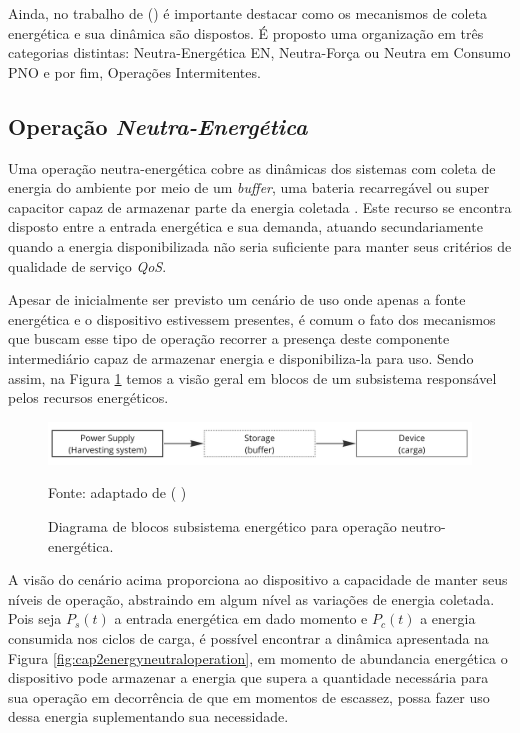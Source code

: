 Ainda, no trabalho de \citeauthor{sliper_energy-driven_2020} (\citeyear{sliper_energy-driven_2020}) é importante destacar como os mecanismos de coleta energética e sua dinâmica são dispostos. É proposto uma organização em três categorias distintas: Neutra-Energética \ac{EN}, Neutra-Força ou Neutra em Consumo \ac{PNO} e por fim, Operações Intermitentes.

\subsection{Operação \textit{Neutra-Energética}}
Uma operação neutra-energética cobre as dinâmicas dos sistemas com coleta de energia do ambiente por meio de um \textit{buffer}, uma bateria recarregável ou super capacitor capaz de armazenar parte da energia coletada \cite{kansal_power_2007}. Este recurso se encontra disposto entre a entrada energética e sua demanda, atuando secundariamente quando a energia disponibilizada não seria suficiente para manter seus critérios de qualidade de serviço \textit{QoS}.

Apesar de inicialmente ser previsto um cenário de uso onde apenas a fonte energética e o dispositivo estivessem presentes, é comum o fato dos mecanismos que buscam esse tipo de operação recorrer a presença deste componente intermediário capaz de armazenar energia e disponibiliza-la para uso. Sendo assim, na Figura \ref{fig:cap2harveststoreuse} temos a visão geral em blocos de um subsistema responsável pelos recursos energéticos.

\begin{figure}[H]
	\centering
	\caption{Diagrama de blocos subsistema energético para operação neutro-energética.}
	\label{fig:cap2harveststoreuse}
	\includegraphics[width=0.7\linewidth]{Imagens/cap2/cap2harvest_store_use}	
	
	Fonte: adaptado de \citeauthor{sudevalayam_energy_2011} (\citeyear{sudevalayam_energy_2011} )
\end{figure}

A visão do cenário acima proporciona ao dispositivo a capacidade de manter seus níveis de operação, abstraindo em algum nível as variações de energia coletada. Pois seja $P_{s}(t)$ a entrada energética em dado momento e  $P_{c}(t)$ a energia consumida nos ciclos de carga, é possível encontrar a dinâmica apresentada na Figura \ref{fig:cap2energyneutraloperation}, em momento de abundancia energética o dispositivo pode armazenar a energia que supera a quantidade necessária para sua operação em decorrência de que em momentos de escassez, possa fazer uso dessa energia suplementando sua necessidade. 


